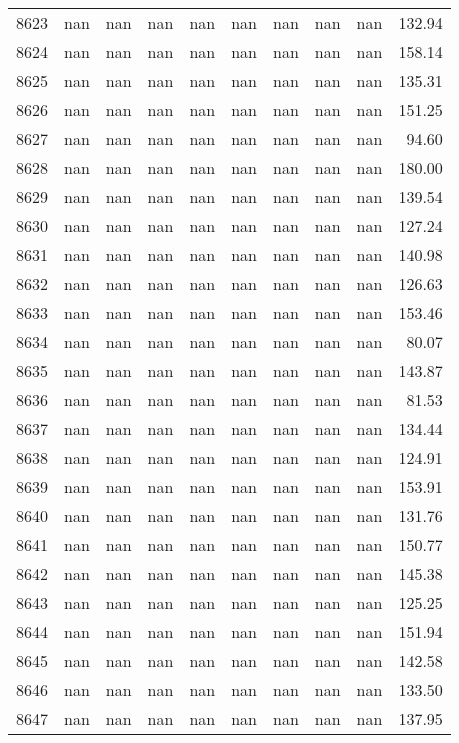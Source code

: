 \begin{tabular}{lrrrrrrrrr}
8623 & nan & nan & nan & nan & nan & nan & nan & nan & 132.94 \\
8624 & nan & nan & nan & nan & nan & nan & nan & nan & 158.14 \\
8625 & nan & nan & nan & nan & nan & nan & nan & nan & 135.31 \\
8626 & nan & nan & nan & nan & nan & nan & nan & nan & 151.25 \\
8627 & nan & nan & nan & nan & nan & nan & nan & nan & 94.60 \\
8628 & nan & nan & nan & nan & nan & nan & nan & nan & 180.00 \\
8629 & nan & nan & nan & nan & nan & nan & nan & nan & 139.54 \\
8630 & nan & nan & nan & nan & nan & nan & nan & nan & 127.24 \\
8631 & nan & nan & nan & nan & nan & nan & nan & nan & 140.98 \\
8632 & nan & nan & nan & nan & nan & nan & nan & nan & 126.63 \\
8633 & nan & nan & nan & nan & nan & nan & nan & nan & 153.46 \\
8634 & nan & nan & nan & nan & nan & nan & nan & nan & 80.07 \\
8635 & nan & nan & nan & nan & nan & nan & nan & nan & 143.87 \\
8636 & nan & nan & nan & nan & nan & nan & nan & nan & 81.53 \\
8637 & nan & nan & nan & nan & nan & nan & nan & nan & 134.44 \\
8638 & nan & nan & nan & nan & nan & nan & nan & nan & 124.91 \\
8639 & nan & nan & nan & nan & nan & nan & nan & nan & 153.91 \\
8640 & nan & nan & nan & nan & nan & nan & nan & nan & 131.76 \\
8641 & nan & nan & nan & nan & nan & nan & nan & nan & 150.77 \\
8642 & nan & nan & nan & nan & nan & nan & nan & nan & 145.38 \\
8643 & nan & nan & nan & nan & nan & nan & nan & nan & 125.25 \\
8644 & nan & nan & nan & nan & nan & nan & nan & nan & 151.94 \\
8645 & nan & nan & nan & nan & nan & nan & nan & nan & 142.58 \\
8646 & nan & nan & nan & nan & nan & nan & nan & nan & 133.50 \\
8647 & nan & nan & nan & nan & nan & nan & nan & nan & 137.95 \\

\end{tabular}
